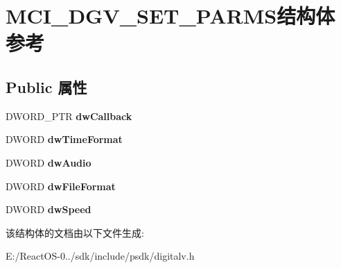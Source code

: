 \hypertarget{struct_m_c_i___d_g_v___s_e_t___p_a_r_m_s}{}\section{M\+C\+I\+\_\+\+D\+G\+V\+\_\+\+S\+E\+T\+\_\+\+P\+A\+R\+M\+S结构体 参考}
\label{struct_m_c_i___d_g_v___s_e_t___p_a_r_m_s}
\subsection*{Public 属性}
\begin{DoxyCompactItemize}
\item 
\mbox{\label{struct_m_c_i___d_g_v___s_e_t___p_a_r_m_s_a266cf67f9a8fa7f9bc05f0a67b4784d7}} 
D\+W\+O\+R\+D\+\_\+\+P\+TR {\bfseries dw\+Callback}
\item 
\mbox{\label{struct_m_c_i___d_g_v___s_e_t___p_a_r_m_s_a1f749155c19c3bb4c616f1bbe797a333}} 
D\+W\+O\+RD {\bfseries dw\+Time\+Format}
\item 
\mbox{\label{struct_m_c_i___d_g_v___s_e_t___p_a_r_m_s_a20785d1a41ad2bc8eb4da1b5d30f2444}} 
D\+W\+O\+RD {\bfseries dw\+Audio}
\item 
\mbox{\label{struct_m_c_i___d_g_v___s_e_t___p_a_r_m_s_a988966027281e06ee69c87bb4e3251b4}} 
D\+W\+O\+RD {\bfseries dw\+File\+Format}
\item 
\mbox{\label{struct_m_c_i___d_g_v___s_e_t___p_a_r_m_s_aa3238a6db0bdac70b84089cfced85385}} 
D\+W\+O\+RD {\bfseries dw\+Speed}
\end{DoxyCompactItemize}


该结构体的文档由以下文件生成\+:\begin{DoxyCompactItemize}
\item 
E\+:/\+React\+O\+S-\/0../sdk/include/psdk/digitalv.\+h\end{DoxyCompactItemize}
